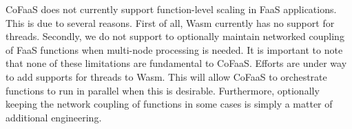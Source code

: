CoFaaS does not currently support function-level scaling in FaaS applications. This is due to several reasons. First of all, Wasm currently has no support for threads. Secondly, we do not support to optionally maintain networked coupling of FaaS functions when multi-node processing is needed. It is important to note that none of these limitations are fundamental to CoFaaS. Efforts are under way to add supports for threads to Wasm. This will allow CoFaaS to orchestrate functions to run in parallel when this is desirable.
Furthermore, optionally keeping the network coupling of functions in some cases is simply a matter of additional engineering.



